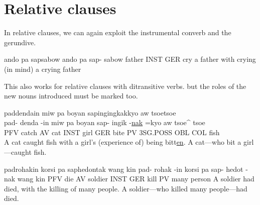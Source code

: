 \section{Relative clauses}
In relative clauses, we can again exploit the instrumental converb and the gerundive.
\begin{examples}
	\ex
	\label{ex:father_who_cried}
	\script ando pa sapsabow
	\bits ando pa sap- sabow
	\gloss father INST GER cry
	\tr a father with crying (in mind)
	\tr a crying father
\end{examples}

This also works for relative clauses with ditransitive verbs.
but the roles of the new nouns introduced must be marked too.
\begin{examples}
	\ex
	\label{ex:cat_who_bit_girl}
	\script paddendain miw pa boyan sapingingkakkyo aw tsoetsoe \\
	\bits pad- denda -in miw pa boyan sap- ingik -\underline{nak} =kyo aw tsoe^ tsoe \\
	\gloss PFV catch AV cat INST girl GER bite PV 3SG.POSS OBL COL fish \\
	\tr A cat caught fish with a girl's (experience of) being bitt\underline{en}.
	\tr A cat---who bit a girl---caught fish.
\end{examples}

\begin{examples}
	\ex
	\label{ex:soldier_died}
	\script padrohakin korsi pa saphedontak wang kin
	\bits pad- rohak -in korsi pa sap- hedot -nak wang kin
	\gloss PFV die AV soldier INST GER kill PV many person
	\tr A soldier had died, with the killing of many people.
	\tr A soldier---who killed many people---had died.
\end{examples}